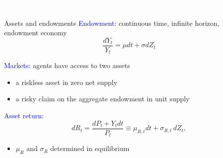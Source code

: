 \begin{transitionframe}
	\begin{center}
		\huge \textcolor{white}{\textbf{Dynamic Model}}
	\end{center}
\end{transitionframe}

\begin{frame}{Assets and endowments}
    \textcolor{blue}{Endowment:} continuous time, infinite horizon, endowment economy 
    \[\frac{d Y_{t}}{Y_{t}}=\mu dt+\sigma dZ_{t}%
    \]
    
    \vspH
    \textcolor{blue}{Markets:} agents have access to two assets\vspM
    \begin{itemize}
        \item a riskless asset in zero net supply\vspM
        \item a risky claim on the aggregate endowment in unit supply
    \end{itemize}
    \vspH
    \textcolor{blue}{Asset return:}
    \[ d R_t = \frac{d P_t + Y_t dt}{P_t} \equiv \mu_{R,t} dt + \sigma_{R,t}\, d Z_t,\]
    \begin{itemize}
        \item $\mu_R$ and $\sigma_R$ determined in equilibrium
    \end{itemize}
\end{frame}


